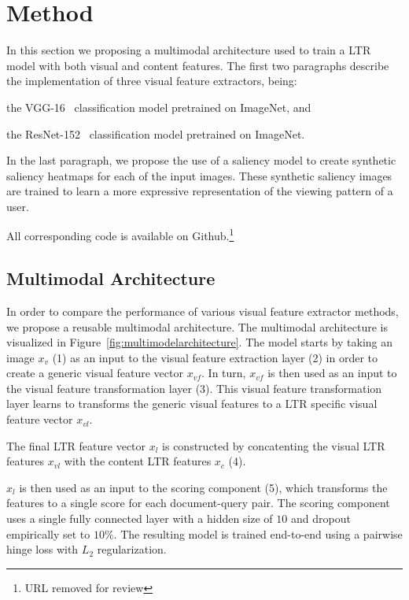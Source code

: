 
\section{Method}
In this section we proposing a multimodal architecture used to train a \ac{LTR} model with both visual and content features. 
The first two paragraphs describe the implementation of three visual feature extractors, being:
\begin{inparaenum}[(i)]
\item the VGG-16~\cite{simonyan2014very} classification model pretrained on ImageNet, and
\item the ResNet-152~\cite{he2016deep} classification model pretrained on ImageNet.
\end{inparaenum} 
In the last paragraph, we propose the use of a saliency model to create synthetic saliency heatmaps for each of the input images. These synthetic saliency images are trained to learn a more expressive representation of the viewing pattern of a user. 

All corresponding code is available on Github.\footnote{URL removed for review}

\subsection{Multimodal Architecture}
In order to compare the performance of various visual feature extractor methods, we propose a reusable multimodal architecture. 
The multimodal architecture is visualized in Figure~\ref{fig:multimodelarchitecture}. 
The model starts by taking an image $x_{v}$ (1) as an input to the visual feature extraction layer (2) in order to create a generic visual feature vector $x_{vf}$. In turn, $x_{vf}$ is then used as an input to the visual feature transformation layer (3).
This visual feature transformation layer learns to transforms the generic visual features to a \ac{LTR} specific visual feature vector $x_{vl}$.

The final \ac{LTR} feature vector $x_{l}$ is constructed by concatenting the visual \ac{LTR} features $x_{vl}$ with the content \ac{LTR} features $x_{c}$ (4). 

$x_{l}$ is then used as an input to the scoring component (5), which transforms the features to a single score for each document-query pair. The scoring component uses a single fully connected layer with a hidden size of $10$ and dropout empirically set to $10\%$. The resulting model is trained end-to-end using a pairwise hinge loss with $L_2$ regularization. 

